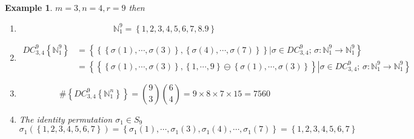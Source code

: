 \documentclass[aps,preprint]{revtex4}%
\newtheorem{example}[theorem]{Example}
\begin{document}
\begin{example}
$m=3,n=4,r=9$ then

\begin{enumerate}
\item
\begin{equation}
\mathbb{N}_{1}^{9}=\left\{  1,2,3,4,5,6,7,8.9\right\}
\end{equation}


\item
\begin{align}
DC_{3,4}^{9}\left\{  \mathbb{N}_{1}^{9}\right\}   &  =\left\{  \left.
\left\{  \left\{  \sigma\left(  1\right)  ,\cdots,\sigma\left(  3\right)
\right\}  ,\left\{  \sigma\left(  4\right)  ,\cdots,\sigma\left(  7\right)
\right\}  \right\}  \right\vert \sigma\in DC_{3,4}^{9};\,\sigma:\mathbb{N}%
_{1}^{9}\rightarrow\mathbb{N}_{1}^{9}\right\} \\
&  =\left\{  \left.  \left\{  \overset{}{\left\{  \sigma\left(  1\right)
,\cdots,\sigma\left(  3\right)  \right\}  },\left\{  1,\cdots,9\right\}
\ominus\left\{  \sigma\left(  1\right)  ,\cdots,\sigma\left(  3\right)
\right\}  \right\}  \right\vert \sigma\in DC_{3,4}^{9};\,\sigma:\mathbb{N}%
_{1}^{9}\rightarrow\mathbb{N}_{1}^{9}\right\}
\end{align}


\item
\begin{equation}
\#\left\{  DC_{3,4}^{9}\left\{  \mathbb{N}_{1}^{n}\right\}  \right\}
=\binom{9}{3}\binom{6}{4}=9\times8\times7\times15=7560
\end{equation}


\item The identity permutation $\sigma_{1}\in S_{9}$
\begin{equation}
\sigma_{1}\left(  \left\{  1,2,3,4,5,6,7\right\}  \right)  =\left\{
\sigma_{1}\left(  1\right)  ,\cdots,\sigma_{1}\left(  3\right)  ,\sigma
_{1}\left(  4\right)  ,\cdots,\sigma_{1}\left(  7\right)  \right\}  =\left\{
1,2,3,4,5,6,7\right\}
\end{equation}



\end{enumerate}
\end{example}
\end{document}
